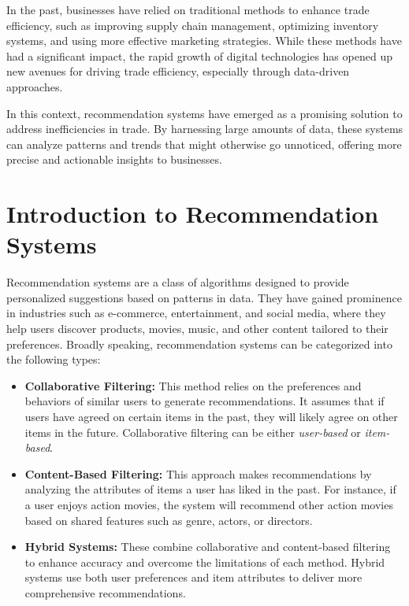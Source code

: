 \documentclass[10pt,twocolumn,twoside,slovak,a4paper]{article}
\begin{document}
\noindent In the past, businesses have relied on traditional methods to enhance trade efficiency, such as improving supply chain management, optimizing inventory systems, and using more effective marketing strategies. While these methods have had a significant impact, the rapid growth of digital technologies has opened up new avenues for driving trade efficiency, especially through data-driven approaches.

In this context, recommendation systems have emerged as a promising solution to address inefficiencies in trade. By harnessing large amounts of data, these systems can analyze patterns and trends that might otherwise go unnoticed, offering more precise and actionable insights to businesses.



\section{Introduction to Recommendation Systems}

Recommendation systems are a class of algorithms designed to provide personalized suggestions based on patterns in data. They have gained prominence in industries such as e-commerce, entertainment, and social media, where they help users discover products, movies, music, and other content tailored to their preferences. Broadly speaking, recommendation systems can be categorized into the following types:

\begin{itemize}
    \item \textbf{Collaborative Filtering:} This method relies on the preferences and behaviors of similar users to generate recommendations. It assumes that if users have agreed on certain items in the past, they will likely agree on other items in the future. Collaborative filtering can be either \textit{user-based} or \textit{item-based}.
    
    \item \textbf{Content-Based Filtering:} This approach makes recommendations by analyzing the attributes of items a user has liked in the past. For instance, if a user enjoys action movies, the system will recommend other action movies based on shared features such as genre, actors, or directors.
    
    \item \textbf{Hybrid Systems:} These combine collaborative and content-based filtering to enhance accuracy and overcome the limitations of each method. Hybrid systems use both user preferences and item attributes to deliver more comprehensive recommendations.
\end{itemize}
\end{document}
